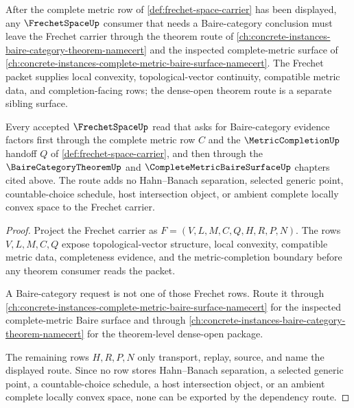 After the complete metric row of \autoref{def:frechet-space-carrier} has been displayed, any $\FrechetSpaceUp$ consumer that needs a Baire-category conclusion must leave the Frechet carrier through the theorem route of \autoref{ch:concrete-instances-baire-category-theorem-namecert} and the inspected complete-metric surface of \autoref{ch:concrete-instances-complete-metric-baire-surface-namecert}. The Frechet packet supplies local convexity, topological-vector continuity, compatible metric data, and completion-facing rows; the dense-open theorem route is a separate sibling surface.

\begin{theorem}
\label{thm:frechet-space-baire-dependency-route}
Every accepted $\FrechetSpaceUp$ read that asks for Baire-category evidence factors first through the complete metric row $C$ and the $\MetricCompletionUp$ handoff $Q$ of \autoref{def:frechet-space-carrier}, and then through the $\BaireCategoryTheoremUp$ and $\CompleteMetricBaireSurfaceUp$ chapters cited above. The route adds no Hahn--Banach separation, selected generic point, countable-choice schedule, host intersection object, or ambient complete locally convex space to the Frechet carrier.
\end{theorem}
\begin{proof}
Project the Frechet carrier as $F=(V,L,M,C,Q,H,R,P,N)$. The rows $V,L,M,C,Q$ expose topological-vector structure, local convexity, compatible metric data, completeness evidence, and the metric-completion boundary before any theorem consumer reads the packet.

A Baire-category request is not one of those Frechet rows. Route it through \autoref{ch:concrete-instances-complete-metric-baire-surface-namecert} for the inspected complete-metric Baire surface and through \autoref{ch:concrete-instances-baire-category-theorem-namecert} for the theorem-level dense-open package.

The remaining rows $H,R,P,N$ only transport, replay, source, and name the displayed route. Since no row stores Hahn--Banach separation, a selected generic point, a countable-choice schedule, a host intersection object, or an ambient complete locally convex space, none can be exported by the dependency route.
\end{proof}


